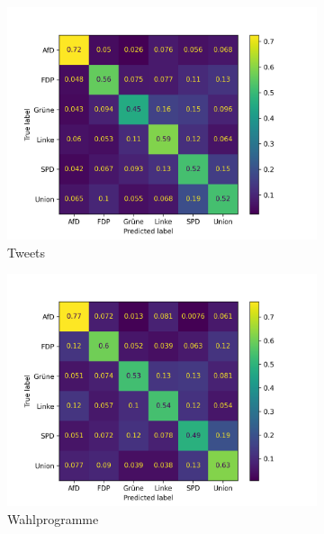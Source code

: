 \begin{figure}[H]
    \centering
    \begin{subfigure}{0.49\textwidth}
      \includegraphics[width=\textwidth]{data/images/modeling/bert/under/tweets_confusion_matrix.png}
      \caption{Tweets} \label{sfig:confusionMatrixBertTweets}
    \end{subfigure}
    \hfill
    \begin{subfigure}{0.49\textwidth}
      \includegraphics[width=\textwidth]{data/images/modeling/bert/under/party_programs_confusion_matrix.png}
      \caption{Wahlprogramme} \label{sfig:confusionMatrixBertManifest}
    \end{subfigure}
    \hfill
    \begin{subfigure}{0.49\textwidth}

\end{subfigure}
\end{figure}
